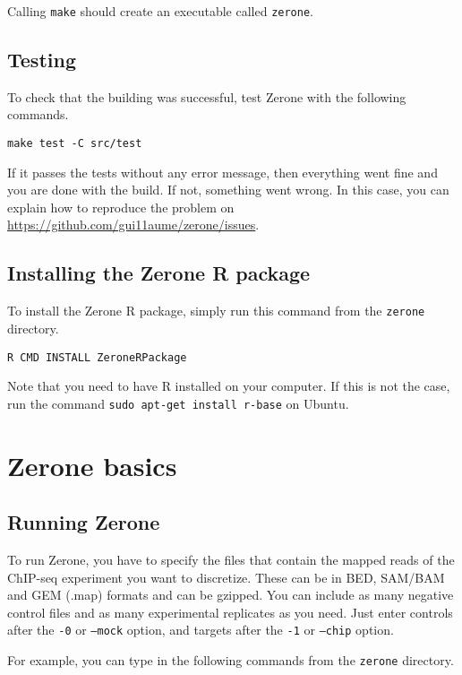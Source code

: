 \documentclass[12pt]{article}
\begin{document}
Calling \texttt{make} should create an executable called \texttt{zerone}.

\subsection{Testing}

To check that the building was successful, test Zerone with
the following commands.

\begin{verbatim}
make test -C src/test
\end{verbatim}

If it passes the tests without any error message, then everything went fine
and you are done with the build. If not, something went
wrong. In this case, you can explain how to reproduce the problem
on \url{https://github.com/gui11aume/zerone/issues}.

\subsection*{Installing the Zerone R package}

To install the Zerone R package, simply run this command from the
\texttt{zerone} directory.

\begin{verbatim}
R CMD INSTALL ZeroneRPackage
\end{verbatim}

Note that you need to have R installed on your computer. If this is not the
case, run the command \texttt{sudo apt-get install r-base} on Ubuntu.

\section{Zerone basics}

\subsection{Running Zerone}

To run Zerone, you have to specify the files that contain the mapped reads
of the ChIP-seq experiment you want to discretize. These can be in BED, SAM/BAM
and GEM (.map) formats and can be gzipped. You can include as many negative
control files and as many experimental replicates as you need. Just enter
controls after the \texttt{-0} or \texttt{--mock} option, and
targets after the \texttt{-1} or \texttt{--chip} option.

For example, you can type in the following commands from the \texttt{zerone}
directory.
\end{document}
